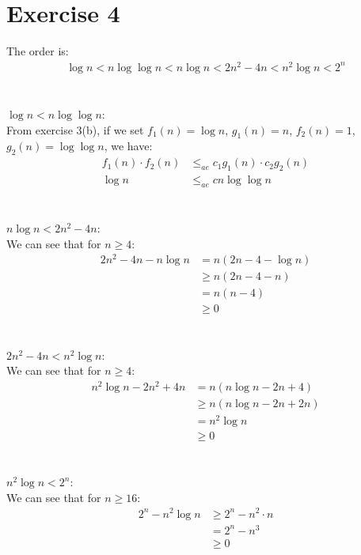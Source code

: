 \documentclass{article}
\begin{document}
\section*{Exercise 4}
The order is:
\begin{align*}
   \log n < n \log \log n < n \log n < 2n^2 - 4n < n^2 \log n < 2^n
\end{align*}
\\
\\
\(\log n < n \log \log n\): \\
From exercise 3(b), if we set \(f_1(n) = \log n\), \(g_1(n) = n\), \(f_2(n) = 1\), \(g_2(n) = \log \log n\), we have:
\begin{align*}
   f_1(n) \cdot f_2(n) &\leq_{ae} c_1 g_1(n) \cdot c_2 g_2(n) \\
   \log n &\leq_{ae} c n \log \log n
\end{align*}
\\
\\
\(n \log n < 2n^2 - 4n\): \\
We can see that for \(n \geq 4\):
\begin{align*}
   2n^2 - 4n - n \log n &= n(2n - 4 - \log n) \\
   &\geq n(2n - 4 - n) \\
   &= n(n - 4) \\
   &\geq 0
\end{align*}
\\
\\
\(2n^2 - 4n < n^2 \log n\): \\
We can see that for \(n \geq 4\):
\begin{align*}
   n^2 \log n - 2n^2 + 4n &= n(n \log n - 2n + 4) \\
   &\geq n(n \log n - 2n + 2n) \\
   &= n^2 \log n \\
   &\geq 0
\end{align*}
\\
\\
\(n^2 \log n < 2^n\): \\
We can see that for \(n \geq 16\):
\begin{align*}
   2^n - n^2 \log n &\geq 2^n - n^2 \cdot n \\
   &= 2^n - n^3 \\
   &\geq 0
\end{align*}
\end{document}
